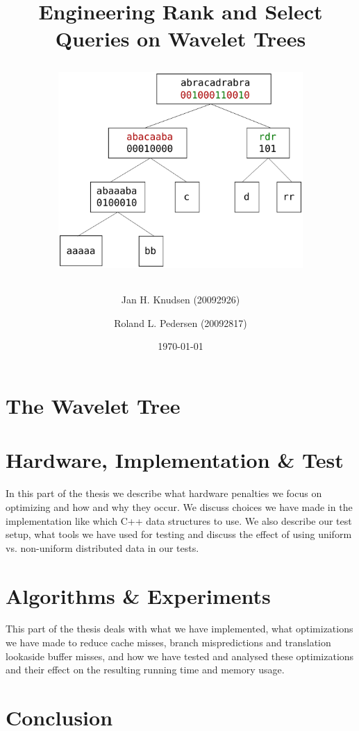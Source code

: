 \documentclass[11pt,twoside,openright]{article}
\title{Engineering Rank and Select Queries on Wavelet Trees
	\vspace{25mm}
	\begin{center}
		\includegraphics[width=0.7\textwidth]{WTdrawing.pdf}
	\end{center}
}
\date{\today}
\author{Jan H. Knudsen (20092926)
\and
Roland L. Pedersen (20092817)
}
\begin{document}
\maketitle

\newpage
\tableofcontents
\newpage


\vspace*{\fill}

\vspace*{\fill}
\newpage

\part{The Wavelet Tree}









\newpage
\clearpage
\part{Hardware, Implementation \& Test}
In this part of the thesis we describe what hardware penalties we focus on optimizing and how and why they occur. 
We discuss choices we have made in the implementation like which C++ data structures to use. 
We also describe our test setup, what tools we have used for testing and discuss the effect of using uniform vs. non-uniform distributed data in our tests.









\newpage
\clearpage
\part{Algorithms \& Experiments}
This part of the thesis deals with what we have implemented, what optimizations we have made to reduce cache misses, branch mispredictions and translation lookaside buffer misses, and how we have tested and analysed these optimizations and their effect on the resulting running time and memory usage.
%









\newpage
\clearpage
\part{Conclusion}





\end{document}
